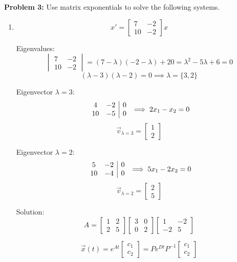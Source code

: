 \documentclass[12pt]{article}
\begin{document}
\pagebreak
\textbf{Problem 3:} Use matrix exponentials to solve the following systems.
\begin{enumerate}
    \item 
    \[x' = \begin{bmatrix}
        7 & -2\\
        10 & -2
    \end{bmatrix}x\] 

    Eigenvalues:
    \[\begin{vmatrix}
        7 & -2\\
        10 & -2
    \end{vmatrix} = (7 - \lambda)(-2 - \lambda) + 20 = \lambda^2 - 5\lambda + 6 = 0\]
    \[(\lambda - 3)(\lambda - 2) = 0 \implies \lambda = \{3, 2\}\]

    Eigenvector $\lambda = 3$: 
    \[\begin{array}{c c | c}
        4 & -2 & 0\\
        10 & -5 & 0        
    \end{array} \implies 2x_1 - x_2 = 0\]
    \[\vec{v}_{\lambda = 3} = \begin{bmatrix}
        1\\2
    \end{bmatrix}\]

    Eigenvector $\lambda = 2$:
    \[\begin{array}{c c | c}
        5 & -2 & 0\\
        10 & -4 & 0        
    \end{array} \implies 5x_1 - 2x_2 = 0\]
    \[\vec{v}_{\lambda = 2} = \begin{bmatrix}
        2\\5
    \end{bmatrix}\]

    Solution:
    \[A = \begin{bmatrix}
        1 & 2\\
        2 & 5
    \end{bmatrix}\begin{bmatrix}
        3 & 0\\
        0 & 2
    \end{bmatrix} \begin{bmatrix}
        1 & -2\\
        -2 & 5
    \end{bmatrix}\]

    \[\vec{x}(t) = e^{At}\begin{bmatrix}
        c_1\\
        c_2
    \end{bmatrix} = Pe^{Dt}P^{-1} \begin{bmatrix}
        c_1\\c_2
    \end{bmatrix}\]
    

\end{enumerate}
\end{document}
